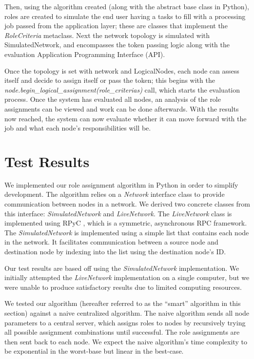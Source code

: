 \documentclass[11pt]{article}
\begin{document}
\begin{multicols}{2}
Then, using the algorithm created (along with the abstract base class in Python), roles are created to simulate the end user having a tasks to fill with a processing job passed from the application layer; these are classes that implement the \textit{RoleCriteria} metaclass.  Next the network topology is simulated with SimulatedNetwork, and encompasses the token passing logic along with the evaluation Application Programming Interface (API).

Once the topology is set with network and LogicalNodes, each node can assess itself and decide to assign itself or pass the token; this begins with the \textit{node.begin\_logical\_assignment(role\_criterias)} call, which starts the evaluation process.  Once the system has evaluated all nodes, an analysis of the role assignments can be viewed and work can be done afterwards.  With the results now reached, the system can now evaluate whether it can move forward with the job and what each node's responsibilities will be.
\vfill
\section{Test Results}

We implemented our role assignment algorithm in Python in order to simplify development. The algorithm relies on a \textit{Network} interface class to provide communication between nodes in a network. We derived two concrete classes from this interface: \textit{SimulatedNetwork} and \textit{LiveNetwork}. The \textit{LiveNetwork} class is implemented using RPyC \cite{rpyc}, which is a symmetric, asynchronous RPC framework. The \textit{SimulatedNetwork} is implemented using a simple list that contains each node in the network. It facilitates communication between a source node and destination node by indexing into the list using the destination node's ID.

Our test results are based off using the \textit{SimulatedNetwork} implementation. We initially attempted the \textit{LiveNetwork} implementation on a single computer, but we were unable to produce satisfactory results due to limited computing resources.

We tested our algorithm (hereafter referred to as the ``smart'' algorithm in this section) against a naive centralized algorithm. The naive algorithm sends all node parameters to a central server, which assigns roles to nodes by recursively trying all possible assignment combinations until successful. The role assignments are then sent back to each node. We expect the naive algorithm's time complexity to be exponential in the worst-base but linear in the best-case.


\end{multicols}
\end{document}
